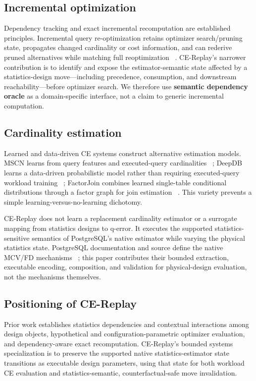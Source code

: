 \documentclass[sigconf,nonacm]{acmart}
\begin{document}
\subsection{Incremental optimization}

Dependency tracking and exact incremental recomputation are established principles. Incremental query re-optimization retains optimizer search/pruning state, propagates changed cardinality or cost information, and can rederive pruned alternatives while matching full reoptimization ~\cite{liu2016incremental}. CE-Replay's narrower contribution is to identify and expose the estimator-semantic state affected by a statistics-design move---including precedence, consumption, and downstream reachability---before optimizer search. We therefore use \textbf{semantic dependency oracle} as a domain-specific interface, not a claim to generic incremental computation.

\subsection{Cardinality estimation}

Learned and data-driven CE systems construct alternative estimation models. MSCN learns from query features and executed-query cardinalities ~\cite{kipf2019learned}; DeepDB learns a data-driven probabilistic model rather than requiring executed-query workload training ~\cite{hilprecht2020deepdb}; FactorJoin combines learned single-table conditional distributions through a factor graph for join estimation ~\cite{wu2023factorjoin}. This variety prevents a simple learning-versus-no-learning dichotomy.

CE-Replay does not learn a replacement cardinality estimator or a surrogate mapping from statistics designs to q-error. It executes the supported statistics-sensitive semantics of PostgreSQL's native estimator while varying the physical statistics state. PostgreSQL documentation and source define the native MCV/FD mechanisms ~\cite{postgresql16docs,postgresql16source}; this paper contributes their bounded extraction, executable encoding, composition, and validation for physical-design evaluation, not the mechanisms themselves.

\subsection{Positioning of CE-Replay}

Prior work establishes statistics dependencies and contextual interactions among design objects, hypothetical and configuration-parametric optimizer evaluation, and dependency-aware exact recomputation. CE-Replay's bounded systems specialization is to preserve the supported native statistics-estimator state transitions as executable design parameters, using that state for both workload CE evaluation and statistics-semantic, counterfactual-safe move invalidation.
\end{document}
